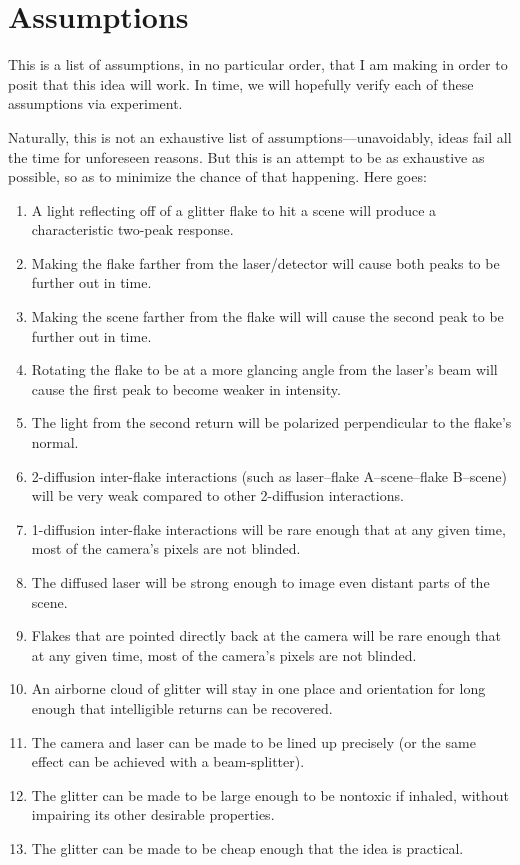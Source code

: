 \documentclass[11pt]{article}
\begin{document}
\section{Assumptions}

This is a list of assumptions, in no particular order, that I am making in order to posit that this idea will work. In time, we will hopefully verify each of these assumptions via experiment.

Naturally, this is not an exhaustive list of assumptions---unavoidably, ideas fail all the time for unforeseen reasons. But this is an attempt to be as exhaustive as possible, so as to minimize the chance of that happening. Here goes:

\begin{enumerate}
    \item A light reflecting off of a glitter flake to hit a scene will produce a characteristic two-peak response.
    \item Making the flake farther from the laser/detector will cause both peaks to be further out in time.
    \item Making the scene farther from the flake will will cause the second peak to be further out in time.
    \item Rotating the flake to be at a more glancing angle from the laser's beam will cause the first peak to become weaker in intensity.
    \item The light from the second return will be polarized perpendicular to the flake's normal.
    \item 2-diffusion inter-flake interactions (such as laser--flake A--scene--flake B--scene) will be very weak compared to other 2-diffusion interactions.
    \item 1-diffusion inter-flake interactions will be rare enough that at any given time, most of the camera's pixels are not blinded.
    \item The diffused laser will be strong enough to image even distant parts of the scene.
    \item Flakes that are pointed directly back at the camera will be rare enough that at any given time, most of the camera's pixels are not blinded.
    \item An airborne cloud of glitter will stay in one place and orientation for long enough that intelligible returns can be recovered.
    \item The camera and laser can be made to be lined up precisely (or the same effect can be achieved with a beam-splitter).
    \item The glitter can be made to be large enough to be nontoxic if inhaled, without impairing its other desirable properties.
    \item The glitter can be made to be cheap enough that the idea is practical.
\end{enumerate}
\end{document}
